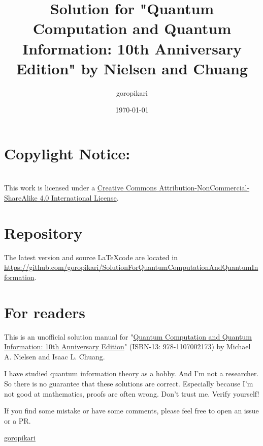 \documentclass[11pt]{book}
\title{Solution for "Quantum Computation and Quantum Information: 10th Anniversary Edition" by Nielsen and Chuang}
\author{goropikari}
\date{\today}
\begin{document}
\maketitle
\thispagestyle{empty}
\setcounter{page}{0} %

\section*{Copylight Notice:}
\ccbyncsa\\
This work is licensed under a \href{http://creativecommons.org/licenses/by-nc-sa/4.0/}{Creative Commons Attribution-NonCommercial-ShareAlike 4.0 International License}.


\section*{Repository}
The latest version and source \LaTeX code are located in\\ \url{https://github.com/goropikari/SolutionForQuantumComputationAndQuantumInformation}.

\section*{For readers}
This is an unofficial solution manual for "\href{http://www.cambridge.org/jp/academic/subjects/physics/quantum-physics-quantum-information-and-quantum-computation/quantum-computation-and-quantum-information-10th-anniversary-edition?format=HB&isbn=9781107002173#BBFv83H3ofgcgG3A.97}{Quantum Computation and Quantum Information: 10th Anniversary Edition}" (ISBN-13: 978-1107002173) by Michael A. Nielsen and Isaac L. Chuang.



I have studied quantum information theory as a hobby.
And I'm not a researcher.
So there is no guarantee that these solutions are correct.
Especially because I'm not good at mathematics, proofs are often wrong.
Don't trust me. Verify yourself!

If you find some mistake or have some comments, please feel free to open an issue or a PR.
\begin{flushright}
    \href{https://github.com/goropikari}{goropikari}
\end{flushright}

\tableofcontents
\newpage

\frontmatter


\mainmatter

\setcounter{chapter}{7}


\setcounter{chapter}{10}




%
\end{document}
